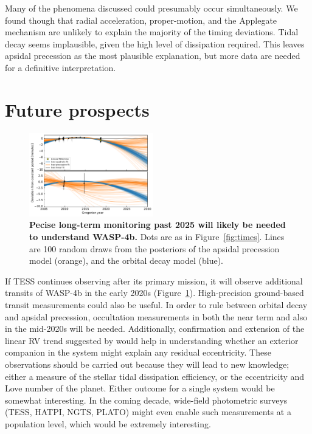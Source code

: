 \documentclass[12pt,twocolumn,tighten]{aastex62}
\begin{document}
Many of the phenomena discussed could presumably occur simultaneously.
We found though that radial acceleration, proper-motion, and the
Applegate mechanism are unlikely to explain the majority of the timing
deviations.  Tidal decay seems implausible, given the high level of
dissipation required.  This leaves apsidal precession as the most
plausible explanation, but more data are needed for a definitive
interpretation.


\section{Future prospects}
\label{sec:future}

\begin{figure}[!t]
	\begin{center}
		\leavevmode
		\includegraphics[width=0.48\textwidth]{f5.pdf}
	\end{center}
  \vspace{-0.5cm}
	\caption{
		{\bf Pecise long-term monitoring past 2025 will likely be needed to
	    understand WASP-4b.}
		Dots are as in Figure~\ref{fig:times}.
		Lines are 100 random draws from the posteriors of the apsidal
		precession model (orange), and the orbital decay model (blue).    
		\label{fig:future}
	}
\end{figure}

If TESS continues observing after its primary mission, it will observe
additional transits of WASP-4b in the early 2020s
(Figure~\ref{fig:future}).  High-precision ground-based transit
measurements could also be useful.  In order to rule between orbital
decay and apsidal precession, occultation measurements in both the
near term and also in the mid-2020s will be needed.  Additionally,
confirmation and extension of the linear RV trend suggested by
\citet{knutson_friends_2014} would help in understanding whether an
exterior companion in the system might explain any residual
eccentricity.  These observations should be carried out because they
will lead to new knowledge; either a measure of the stellar tidal
dissipation efficiency, or the eccentricity and Love number of the
planet.  Either outcome for a single system would be somewhat
interesting.  In the coming decade, wide-field photometric surveys
(TESS, HATPI, NGTS, PLATO) might even enable such measurements at a
population level, which would be extremely interesting.
\end{document}
